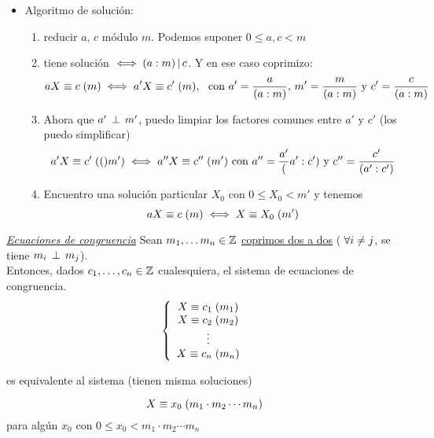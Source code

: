 \documentclass[12pt,a4paper, spanish]{article}
\begin{document}
\begin{itemize}
  \item Algoritmo de solución:
    \begin{enumerate}[label=\arabic*)] 
  \item reducir $a,\, c$ módulo $m$. Podemos suponer $0 \leq a, c < m$
  \item tiene solución $\sisolosi (a:m) \divide c$. Y en ese caso coprimizo:
    \[
      \congruencia{aX}{c}{m} \sisolosi \congruencia{a'X}{c'}{m},\ \text{ con } a' = \frac{a}{(a:m)},\, m' = \frac{m}{(a:m)} \text{ y } c' = \frac{c}{(a:m)}
    \]
    \item   Ahora que $a' \cop m'$, puedo limpiar los factores comunes entre $a'$ y $c'$ (los puedo simplificar)
      \[
        \congruencia{a'X}{c'}(m') \sisolosi \congruencia{a''X}{c''}{m'} \text{ con } a'' = \frac{a'}(a':c') \text{ y } c'' = \frac{c'}{(a':c')}
      \]
    \item Encuentro una solución particular $X_0$ con $ 0\leq X_0 < m'$ y tenemos
      \[
        \congruencia{aX}{c}{m} \sisolosi \congruencia{X}{X_0}{m'}
      \]
     \end{enumerate}

\end{itemize}

\textit\underline{Ecuaciones de congruencia}
Sean $m_1,\dots m_n \en \enteros$ \underline{coprimos dos a dos} ($\paratodo i \distinto j$, se tiene $m_i \cop m_j$). \\
Entonces, dados $c_1,\dots, c_n \en \enteros$ cualesquiera, el sistema de ecuaciones de congruencia. 
\[
  \llave{c}{
  \congruencia{X}{c_1}{m_1}\\
  \congruencia{X}{c_2}{m_2}\\
  \vdots\\
  \congruencia{X}{c_n}{m_n}
  }
\] 

es equivalente al sistema (tienen misma soluciones)

\[
  \congruencia{X}{x_0}{m_1\cdot m_2 \cdots m_n}
\]
para algún $x_0$ con $0\leq x_0 < m_1\cdot m_2 \cdots m_n$
\end{document}
